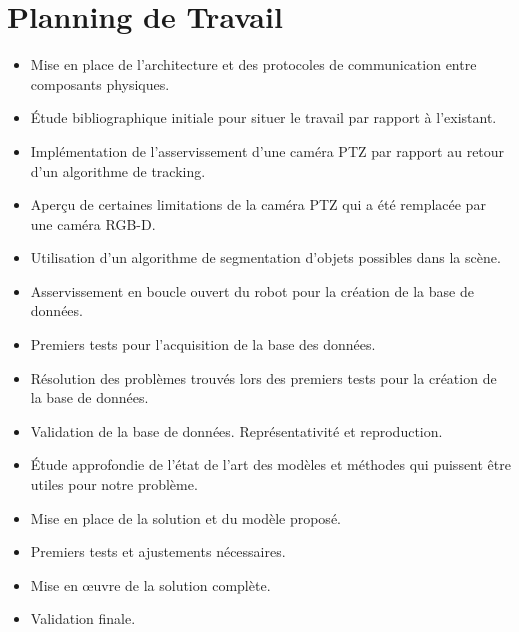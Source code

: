 \section{Planning de Travail}
\begin{itemize}
\item Mise en place de l'architecture et des protocoles de communication entre composants physiques.
\item Étude bibliographique initiale pour situer le travail par rapport à l'existant.
\item Implémentation de l'asservissement d'une caméra PTZ par rapport au retour d'un algorithme de tracking.
\item Aperçu de certaines limitations de la caméra PTZ qui a été remplacée par une caméra RGB-D.
\item Utilisation d'un algorithme de segmentation d'objets possibles dans la scène.
\item Asservissement en boucle ouvert du robot pour la création de la base de données.
\item Premiers tests pour l'acquisition de la base des données.
\item Résolution des problèmes trouvés lors des premiers tests pour la création de la base de données.
\item Validation de la base de données. Représentativité et reproduction.
\item Étude approfondie de l’état de l'art des modèles et méthodes qui puissent être utiles pour notre problème.
\item Mise en place de la solution et du modèle proposé.
\item Premiers tests et ajustements nécessaires.
\item Mise en œuvre de la solution complète.
\item Validation finale.    
\end{itemize}
